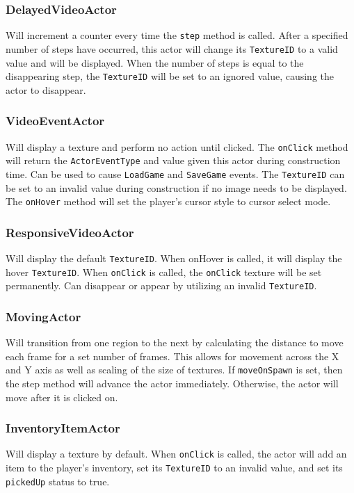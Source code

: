 \documentclass{article}
\begin{document}
    \subsubsection{DelayedVideoActor}
    Will increment a counter every time the \texttt{step} method is called. After a specified number of steps have occurred, this actor will change its \texttt{TextureID} to a valid value and will be displayed. When the number of steps is equal to the disappearing step, the \texttt{TextureID} will be set to an ignored value, causing the actor to disappear.
    \subsubsection{VideoEventActor}
    Will display a texture and perform no action until clicked. The \texttt{onClick} method will return the \texttt{ActorEventType} and value given this actor during construction time. Can be used to cause \texttt{LoadGame} and \texttt{SaveGame} events. The \texttt{TextureID} can be set to an invalid value during construction if no image needs to be displayed. The \texttt{onHover} method will set the player's cursor style to cursor select mode.
    \subsubsection{ResponsiveVideoActor}
    Will display the default \texttt{TextureID}. When onHover is called, it will display the hover \texttt{TextureID}. When \texttt{onClick} is called, the \texttt{onClick} texture will be set permanently. Can disappear or appear by utilizing an invalid \texttt{TextureID}.
    \subsubsection{MovingActor}
    Will transition from one region to the next by calculating the distance to move each frame for a set number of frames. This allows for movement across the X and Y axis as well as scaling of the size of textures. If \texttt{moveOnSpawn} is set, then the step method will advance the actor immediately. Otherwise, the actor will move after it is clicked on.
    \subsubsection{InventoryItemActor}
    Will display a texture by default. When \texttt{onClick} is called, the actor will add an item to the player's inventory, set its \texttt{TextureID} to an invalid value, and set its \texttt{pickedUp} status to true.
\end{document}
